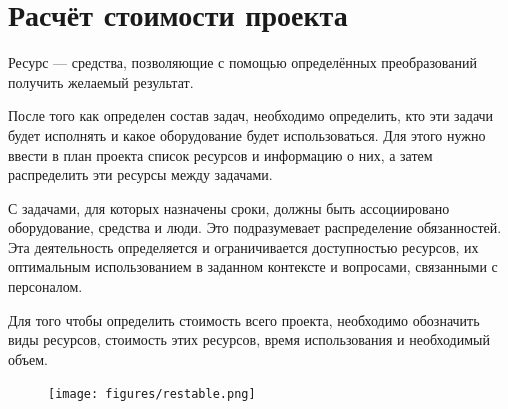 \section{Расчёт стоимости проекта}

Ресурс — средства, позволяющие с помощью определённых преобразований получить желаемый результат. 

После того как определен состав задач, необходимо определить, кто эти задачи будет исполнять и какое оборудование будет использоваться. Для этого нужно ввести в план проекта список ресурсов и информацию о них, а затем распределить эти ресурсы между задачами. 

С задачами, для которых назначены сроки, должны быть ассоциировано оборудование, средства и люди. Это подразумевает распределение обязанностей. Эта деятельность определяется и ограничивается доступностью ресурсов, их оптимальным использованием в заданном контексте и вопросами, связанными с персоналом.  

Для того чтобы определить стоимость всего проекта, необходимо обозначить виды ресурсов, стоимость этих ресурсов, время использования и необходимый объем.

\begin{figure}[H]
	\centering
	\texttt{[image: figures/restable.png]}
	\label{fig:restable}
\end{figure} 

